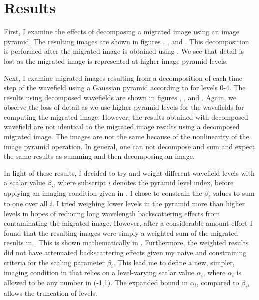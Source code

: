 \section{Results}

First, I examine the effects of decomposing a migrated image using an image pyramid.  The resulting images are shown in figures , , and .  This decomposition is performed after the migrated image is obtained using .  We see that detail is lost as the migrated image is represented at higher image pyramid levels.

Next, I examine migrated images resulting from a decomposition of each time step of the wavefield using a Gaussian pyramid according to  for levels 0-4.  The results using decomposed wavefields are shown in figures , , and .  Again, we observe the loss of detail as we use higher pyramid levels for the wavefields for computing the migrated image.  However, the results obtained with decomposed wavefield are not identical to the migrated image results using a decomposed migrated image.  The images are not the same because of the nonlinearity of the image pyramid operation.  In general, one can not decompose and sum and expect the same results as summing and then decomposing an image.

In light of these results, I decided to try and weight different wavefield levels with a scalar value $\beta_i$, where subscript $i$ denotes the pyramid level index, before applying an imaging condition given in .  I chose to constrain the $\beta_i$ values to sum to one over all $i$.  I tried weighing lower levels in the pyramid more than higher levels in hopes of reducing long wavelength backscattering effects from contaminating the migrated image.  However, after a considerable amount effort I found that the resulting images were simply a weighted sum of the migrated results in .  This is shown mathematically in .  Furthermore, the weighted results did not have attenuated backscattering effects given my naive and constraining criteria for the scaling parameter $\beta_i$.  This lead me to define a new, simpler, imaging condition in  that relies on a level-varying scalar value $\alpha_i$, where $\alpha_i$ is allowed to be any number in (-1,1).  The expanded bound in $\alpha_i$, compared to $\beta_i$, allows the truncation of levels.

